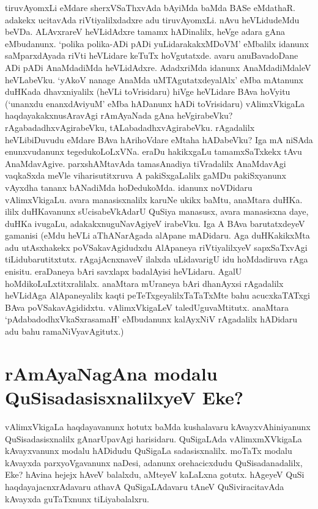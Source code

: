 tiruvAyomxLi eMdare sherxVSaThxvAda bAyiMda baMda BASe eMdathaR. adakekx ucitavAda riVtiyalilxdadxre adu tiruvAyomxLi. nAvu heVLidudeMdu beVDa. ALAvxrareV heVLidAdxre tamamx hADinalilx, heVge adara gAna eMbudanunx. `polika polika-ADi pADi yuLidarakakxMDoVM' eMbalilx idanunx saMparxdAyada riVti heVLidare keTuTx hoVgutatxde. avaru anuBavadoDane ADi pADi AnaMdadiMda heVLidAdxre. AdadxriMda idanunx AnaMdadiMdaleV heVLabeVku. `yAkoV nanage AnaMda uMTAgutatxdeyalAlx' eMba mAtanunx duHKada dhavxniyalilx (heVLi toVrisidaru) hiVge heVLidare BAva hoVyitu (`unanxdu enanxdAviyuM' eMba hADanunx hADi toVrisidaru) vAlimxVkigaLa haqdayakakxnusAravAgi rAmAyaNada gAna heVgirabeVku? rAgabadadhxvAgirabeVku, tALabadadhxvAgirabeVku. rAgadalilx heVLibiDuvudu eMdare BAva hArihoVdare eMtaha hADabeVku? Iga mA niSAda enunxvudanunx tegedukoLoLxVNa. eraDu hakikxgaLu tamamxSaTxkekx tAvu AnaMdavAgive. parxshAMtavAda tamasAnadiya tiVradalilx AnaMdavAgi vaqkaSxda meVle viharisutitxruva A pakiSxgaLalilx gaMDu pakiSxyanunx vAyxdha tananx bANadiMda hoDedukoMda. idanunx noVDidaru vAlimxVkigaLu. avara manasisxnalilx karuNe ukikx baMtu, anaMtara duHKa. ililx duHKavanunx sUcisabeVkAdarU QuSiya manasusx, avara manasisxna daye, duHKa ivugaLu, adakakxnuguNavAgiyeV irabeVku. Iga A BAva barutatxdeyeV gamanisi (eMdu heVLi aThANarAgada alApane mADidaru. Aga duHKakikxMta adu utAsxhakekx poVSakavAgidudxdu AlApaneya riVtiyalilxyeV sapxSaTxvAgi tiLidubarutitxtutx. rAgajAcnxnaveV ilalxda uLidavarigU idu hoMdadiruva rAga enisitu. eraDaneya bAri savxlapx badalAyisi heVLidaru. AgalU hoMdikoLuLxtitxralilalx. anaMtara mUraneya bAri dhanAyxsi rAgadalilx heVLidAga AlApaneyalilx kaqti peTeTxgeyalilxTaTaTxMte bahu acucxkaTATxgi BAva poVSakavAgididxtu. vAlimxVkigaLeV taledUguvaMtitutx. anaMtara `pAdabadodhxV\s kaSxrasamaH'\label{242} eMbudanunx kalAyxNiV rAgadalilx hADidaru adu bahu ramaNiVyavAgitutx.)


\section*{rAmAyaNagAna modalu QuSisadasisxnalilxyeV Eke?}

vAlimxVkigaLa haqdayavanunx hotutx baMda kushalavaru kAvayxvAhiniyanunx QuSisadasisxnalilx gAnarUpavAgi harisidaru. QuSigaLAda vAlimxmXVkigaLa kAvayxvanunx modalu hADidudu QuSigaLa sadasisxnalilx. moTaTx modalu kAvayxda parxyoVgavanunx naDesi, adanunx orehacicxdudu QuSisadanadalilx, Eke? hAvina hejejx hAveV balalxdu, aMteyeV kaLaLxna gotutx. hAgeyeV  QuSi haqdayajacnxrAdavaru athavA QuSigaLAdavaru tAneV QuSiviracitavAda kAvayxda guTaTxnunx tiLiyabalalxru. 

